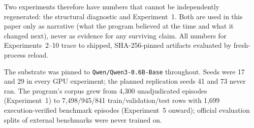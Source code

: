 \documentclass[10pt,a4paper]{article}
\begin{document}
Two experiments therefore have numbers that cannot be independently
regenerated: the structural diagnostic and Experiment~1. Both are used in this
paper only as narrative (what the program believed at the time and what it
changed next), never as evidence for any surviving claim. All numbers for
Experiments~2--10 trace to shipped, SHA-256-pinned artifacts evaluated by
fresh-process reload.

The substrate was pinned to \texttt{Qwen/Qwen3-0.6B-Base} throughout. Seeds
were 17 and 29 in every GPU experiment; the planned replication seeds 41
and 73 never ran. The program's corpus grew from 4{,}300 unadjudicated
episodes (Experiment~1) to 7{,}498/945/841 train/validation/test rows with
1{,}699 execution-verified benchmark episodes (Experiment~5 onward); official
evaluation splits of external benchmarks were never trained on.
\end{document}
